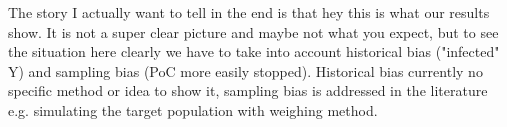 The story I actually want to tell in the end is that hey this is what our results show. It is not a super clear picture and maybe not what you expect, but to see the situation here clearly we have to take into account historical bias ("infected" Y) and sampling bias (PoC more easily stopped). Historical bias currently no specific method or idea to show it, sampling bias is addressed in the literature e.g. simulating the target population with weighing method.




